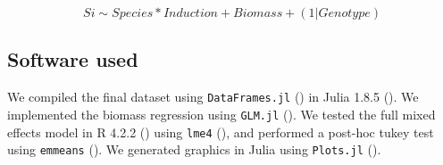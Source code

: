 \documentclass[12pt, letterpaper, ]{report}
\begin{document}
\[Si \sim Species * Induction + Biomass + (1|Genotype)\]



\subsection{Software used}

We compiled the final dataset using \verb|DataFrames.jl| (\cite{bogumil_kaminski_2023_7632427}) in Julia 1.8.5 (\cite{bezanson2017julia}). We implemented the biomass regression using \verb|GLM.jl| (\cite{douglas_bates_2023_7529836}). We tested the full mixed effects model in R 4.2.2 (\cite{r_core_team_2022}) using \verb|lme4| (\cite{lme4_bates_2015}), and performed a post-hoc tukey test using \verb|emmeans| (\cite{lenth_2023_emmeans}). We generated graphics in Julia using \verb|Plots.jl| (\cite{tom_breloff_2023_7736124}). 
\end{document}
